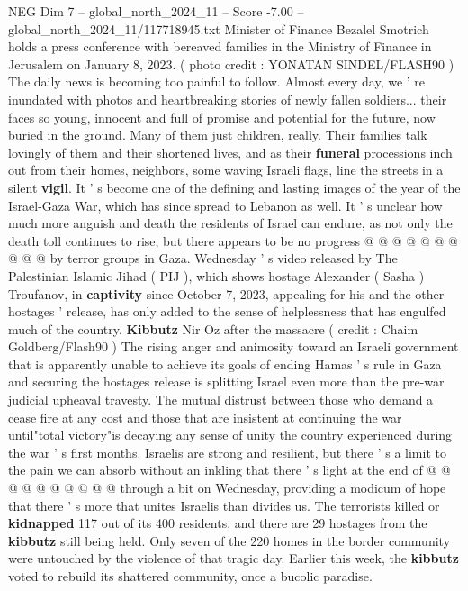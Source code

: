 \begin{textsample}{NEG Dim 7 – global\_north\_2024\_11 – Score -7.00 – global\_north\_2024\_11/117718945.txt}  \label{ex:f7_neg_253}
Minister of Finance Bezalel Smotrich holds a press conference with bereaved families in the Ministry of Finance in Jerusalem on January 8, 2023. ( photo credit : YONATAN SINDEL/FLASH90 ) The daily news is becoming too painful to follow.
Almost every day, we ' re inundated with photos and heartbreaking stories of newly fallen soldiers... their faces so young, innocent and full of promise and potential for the future, now buried in the ground.
Many of them just children, really.
Their families talk lovingly of them and their shortened lives, and as their \textbf{funeral} processions inch out from their homes, neighbors, some waving Israeli flags, line the streets in a silent \textbf{vigil}.
It ' s become one of the defining and lasting images of the year of the Israel-Gaza War, which has since spread to Lebanon as well.
It ' s unclear how much more anguish and death the residents of Israel can endure, as not only the death toll continues to rise, but there appears to be no progress @ @ @ @ @ @ @ @ @ @ by terror groups in Gaza.
Wednesday ' s video released by The Palestinian Islamic Jihad ( PIJ ), which shows hostage Alexander ( Sasha ) Troufanov, in \textbf{captivity} since October 7, 2023, appealing for his and the other hostages ' release, has only added to the sense of helplessness that has engulfed much of the country. \textbf{Kibbutz} Nir Oz after the massacre ( credit : Chaim Goldberg/Flash90 ) The rising anger and animosity toward an Israeli government that is apparently unable to achieve its goals of ending Hamas ' s rule in Gaza and securing the hostages release is splitting Israel even more than the pre-war judicial upheaval travesty.
The mutual distrust between those who demand a cease fire at any cost and those that are insistent at continuing the war until"total victory"is decaying any sense of unity the country experienced during the war ' s first months.
Israelis are strong and resilient, but there ' s a limit to the pain we can absorb without an inkling that there ' s light at the end of @ @ @ @ @ @ @ @ @ @ through a bit on Wednesday, providing a modicum of hope that there ' s more that unites Israelis than divides us.
The terrorists killed or \textbf{kidnapped} 117 out of its 400 residents, and there are 29 hostages from the \textbf{kibbutz} still being held.
Only seven of the 220 homes in the border community were untouched by the violence of that tragic day.
Earlier this week, the \textbf{kibbutz} voted to rebuild its shattered community, once a bucolic paradise.

\end{textsample}
